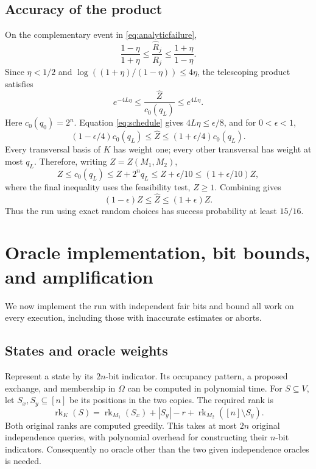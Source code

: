 \documentclass[11pt]{article}
\theoremstyle{definition}
\newcommand{\rank}{\operatorname{rk}}
\newcommand{\Om}{\Omega}
\begin{document}
\subsection{Accuracy of the product}

On the complementary event in \eqref{eq:analyticfailure},
\begin{equation}\label{eq:ratioerror}
 \frac{1-\eta}{1+\eta}\le\frac{\widehat R_j}{R_j}
               \le\frac{1+\eta}{1-\eta}.
\end{equation}
Since $\eta<1/2$ and
$\log((1+\eta)/(1-\eta))\le4\eta$, the telescoping product satisfies
\[
 e^{-4L\eta}\le\frac{\widehat Z}{c_0(q_L)}\le e^{4L\eta}.
\]
Here $c_0(q_0)=2^n$.  Equation \eqref{eq:schedule} gives
$4L\eta\le\epsilon/8$, and for $0<\epsilon<1$,
\begin{equation}\label{eq:productaccuracy}
 (1-\epsilon/4)c_0(q_L)\le\widehat Z
                         \le(1+\epsilon/4)c_0(q_L).
\end{equation}
Every transversal basis of $K$ has weight one; every other transversal
has weight at most $q_L$.  Therefore, writing $Z=Z(M_1,M_2)$,
\begin{equation}\label{eq:contamination}
 Z\le c_0(q_L)\le Z+2^nq_L
       \le Z+\epsilon/10\le(1+\epsilon/10)Z,
\end{equation}
where the final inequality uses the feasibility test, $Z\ge1$.
Combining  gives
\[
 (1-\epsilon)Z\le\widehat Z\le(1+\epsilon)Z.
\]
Thus the run using exact random choices has success probability at
least $15/16$.

\section{Oracle implementation, bit bounds, and amplification}
\label{sec:implementation}

We now implement the run with independent fair bits and bound all work
on every execution, including those with inaccurate estimates or aborts.

\subsection{States and oracle weights}

Represent a state by its $2n$-bit indicator.  Its occupancy pattern, a
proposed exchange, and membership in $\Om$ can be computed in polynomial
time.  For $S\subseteq V$, let $S_x,S_y\subseteq[n]$ be its positions
in the two copies.  The required rank is
\begin{equation}\label{eq:oracleweight}
 \rank_K(S)=\rank_{M_1}(S_x)+|S_y|-r
                              +\rank_{M_2}([n]\setminus S_y).
\end{equation}
Both original ranks are computed greedily.  This takes at most $2n$
original independence queries, with polynomial overhead for constructing
their $n$-bit indicators.  Consequently no oracle other than the two
given independence oracles is needed.
\end{document}
